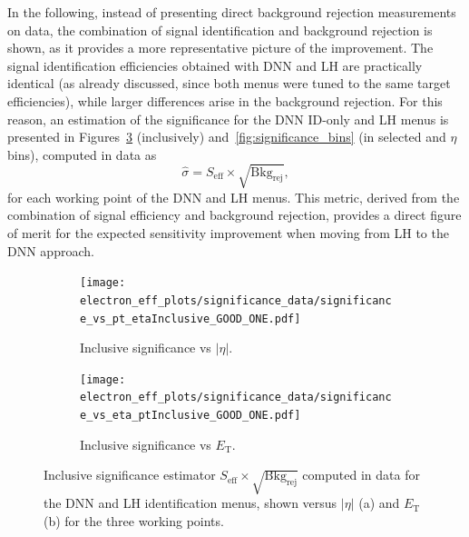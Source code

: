 In the following, instead of presenting direct background rejection measurements on data, 
the combination of signal identification and background rejection is shown, 
as it provides a more representative picture of the improvement. 
The signal identification efficiencies obtained with DNN and LH are practically identical 
(as already discussed, since both menus were tuned to the same target efficiencies), 
while larger differences arise in the background rejection. 
For this reason, an estimation of the significance for the DNN ID-only and LH menus is presented in Figures~\ref{fig:significance_inclusive} (inclusively) and~\ref{fig:significance_bins} (in selected \et and $\eta$ bins), computed in data as
\begin{equation}
\hat{\sigma} = S_{\mathrm{eff}} \times \sqrt{\mathrm{Bkg}_{\mathrm{rej}}},
\end{equation}
for each working point of the DNN and LH menus. This metric, derived from the combination of signal efficiency and background rejection, provides a direct figure of merit for the expected sensitivity improvement when moving from LH to the DNN approach.


\begin{figure}[htbp]
  \centering

  \begin{subfigure}{0.48\textwidth}
    \centering
    \texttt{[image: electron\_eff\_plots/significance\_data/significance\_vs\_pt\_etaInclusive\_GOOD\_ONE.pdf]}
    \caption{\small{Inclusive significance vs $|\eta|$.}}
    \label{fig:significance_inclusive_eta}
  \end{subfigure}\hfill
  \begin{subfigure}{0.48\textwidth}
    \centering
    \texttt{[image: electron\_eff\_plots/significance\_data/significance\_vs\_eta\_ptInclusive\_GOOD\_ONE.pdf]}
    \caption{\small{Inclusive significance vs $E_{\mathrm{T}}$.}}
    \label{fig:significance_inclusive_pt}
  \end{subfigure}

  \caption{Inclusive significance estimator $S_{\mathrm{eff}} \times \sqrt{\mathrm{Bkg}_{\mathrm{rej}}}$ 
  computed in data for the DNN and LH identification menus, shown versus $|\eta|$ (a) 
  and $E_{\mathrm{T}}$ (b) for the three working points.}
  \label{fig:significance_inclusive}
\end{figure}


